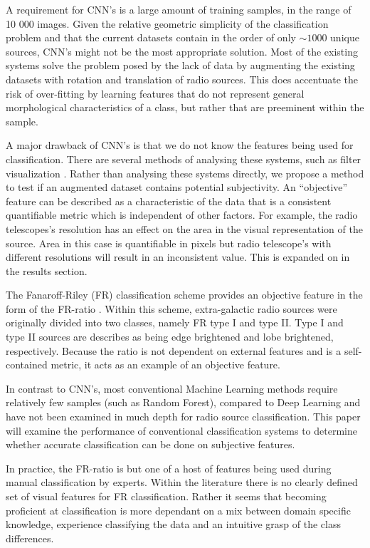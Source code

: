 \documentclass[conference]{IEEEtran}
\begin{document}
A requirement for CNN's is a large amount of training samples, in the range of 10 000 images. Given the relative geometric simplicity of the classification problem and that the current datasets contain in the order of only $\sim1000$ unique sources, CNN's might not be the most appropriate solution. 
Most of the existing systems solve the problem posed by the lack of data by augmenting the existing datasets with rotation and translation of radio sources. This does accentuate the risk of over-fitting by learning features that do not represent general morphological characteristics of a class, but rather that are preeminent within the sample.

A major drawback of CNN's is that we do not know the features being used for classification. There are several methods of analysing these systems, such as filter visualization \cite{aniyan_thorat_2017}. Rather than analysing these systems directly, we propose a method to test if an augmented dataset contains potential subjectivity. An ``objective'' feature can be described as a characteristic of the data that is a consistent quantifiable metric which is independent of other factors. For example, the radio telescopes's resolution has an effect on the area in the visual representation of the source. Area in this case is quantifiable in pixels but radio telescope's with different resolutions will result in an inconsistent value. This is expanded on in the results section.

The Fanaroff-Riley (FR) classification scheme provides an objective feature in the form of the FR-ratio \cite{fanaroff_riley_1974}. Within this scheme, extra-galactic radio sources were originally divided into two classes, namely FR type I and type II. Type I and type II sources are describes as being edge brightened and lobe brightened, respectively. Because the ratio is not dependent on external features and is a self-contained metric, it acts as an example of an objective feature.

In contrast to CNN's, most conventional Machine Learning methods require relatively few samples (such as Random Forest), compared to Deep Learning and have not been examined in much depth for radio source classification. This paper will examine the performance of conventional classification systems to determine whether accurate classification can be done on subjective features.

In practice, the FR-ratio is but one of a host of features being used during manual classification by experts. Within the literature there is no 
clearly defined set of visual features for FR classification. Rather it seems that
becoming proficient at classification is more dependant on a mix between domain 
specific knowledge, experience classifying the data and an intuitive grasp of the class differences. 
\end{document}
